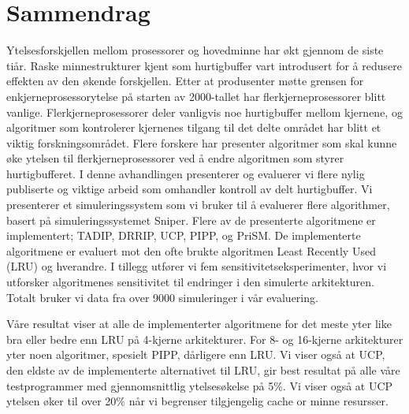 \section*{Sammendrag}
Ytelsesforskjellen mellom prosessorer og hovedminne har økt gjennom de siste tiår.
Raske minnestrukturer kjent som hurtigbuffer vart introdusert for å redusere effekten av den økende forskjellen.
Etter at produsenter møtte grensen for enkjerneprosessorytelse på starten av 2000-tallet har flerkjerneprosessorer blitt vanlige.
Flerkjerneprosessorer deler vanligvis noe hurtigbuffer mellom kjernene, og algoritmer som kontrolerer kjernenes tilgang til det delte området har blitt et viktig forskningsområdet.
Flere forskere har presenter algoritmer som skal kunne øke ytelsen til flerkjerneprosessorer ved å endre algoritmen som styrer hurtigbufferet.
I denne avhandlingen presenterer og evaluerer vi flere nylig publiserte og viktige arbeid som omhandler kontroll av delt hurtigbuffer.
Vi presenterer et simuleringssystem som vi bruker til å evaluerer flere algorithmer, basert på simuleringssystemet Sniper.
Flere av de presenterte algoritmene er implementert; TADIP, DRRIP, UCP, PIPP, og PriSM.
De implementerte algoritmene er evaluert mot den ofte brukte algoritmen Least Recently Used (LRU) og hverandre.
I tillegg utfører vi fem sensitivitetseksperimenter, hvor vi utforsker algoritmenes sensitivitet til endringer i den simulerte arkitekturen.
Totalt bruker vi data fra over 9000 simuleringer i vår evaluering.

Våre resultat viser at alle de implementerter algoritmene for det meste yter like bra eller bedre enn LRU på 4-kjerne arkitekturer.
For 8- og 16-kjerne arkitekturer yter noen algoritmer, spesielt PIPP, dårligere enn LRU.
Vi viser også at UCP, den eldste av de implementerte alternativet til LRU, gir best resultat på alle våre testprogrammer med gjennomsnittlig ytelsesøkelse på 5\%.
Vi viser også at UCP ytelsen øker til over 20\% når vi begrenser tilgjengelig cache or minne resursser.

\clearpage